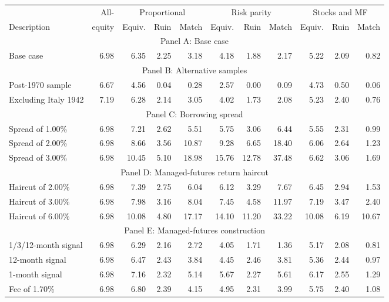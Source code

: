 \begin{table}[p]
{\small\setlength{\tabcolsep}{3pt}\begin{tabular}{lrrrrrrrrrr}\toprule
 & All- & \multicolumn{3}{c}{Proportional} & \multicolumn{3}{c}{Risk parity} & \multicolumn{3}{c}{Stocks and MF} \\ \cmidrule(lr){3-5}\cmidrule(lr){6-8}\cmidrule(lr){9-11}
Description & equity & Equiv. & Ruin & Match & Equiv. & Ruin & Match & Equiv. & Ruin & Match \\ \midrule
\multicolumn{11}{c}{Panel A: Base case} \\
Base case & 6.98 & 6.35 & 2.25 & 3.18 & 4.18 & 1.88 & 2.17 & 5.22 & 2.09 & 0.82 \\
\multicolumn{11}{c}{Panel B: Alternative samples} \\
Post-1970 sample & 6.67 & 4.56 & 0.04 & 0.28 & 2.57 & 0.00 & 0.09 & 4.73 & 0.50 & 0.06 \\
Excluding Italy 1942 & 7.19 & 6.28 & 2.14 & 3.05 & 4.02 & 1.73 & 2.08 & 5.23 & 2.40 & 0.76 \\
\multicolumn{11}{c}{Panel C: Borrowing spread} \\
Spread of 1.00\% & 6.98 & 7.21 & 2.62 & 5.51 & 5.75 & 3.06 & 6.44 & 5.55 & 2.31 & 0.99 \\
Spread of 2.00\% & 6.98 & 8.66 & 3.56 & 10.87 & 9.28 & 6.65 & 18.40 & 6.06 & 2.64 & 1.23 \\
Spread of 3.00\% & 6.98 & 10.45 & 5.10 & 18.98 & 15.76 & 12.78 & 37.48 & 6.62 & 3.06 & 1.69 \\
\multicolumn{11}{c}{Panel D: Managed-futures return haircut} \\
Haircut of 2.00\% & 6.98 & 7.39 & 2.75 & 6.04 & 6.12 & 3.29 & 7.67 & 6.45 & 2.94 & 1.53 \\
Haircut of 3.00\% & 6.98 & 7.98 & 3.16 & 8.04 & 7.45 & 4.58 & 11.97 & 7.19 & 3.47 & 2.40 \\
Haircut of 6.00\% & 6.98 & 10.08 & 4.80 & 17.17 & 14.10 & 11.20 & 33.22 & 10.08 & 6.19 & 10.67 \\
\multicolumn{11}{c}{Panel E: Managed-futures construction} \\
1/3/12-month signal & 6.98 & 6.29 & 2.16 & 2.72 & 4.05 & 1.71 & 1.36 & 5.17 & 2.08 & 0.81 \\
12-month signal & 6.98 & 6.47 & 2.43 & 3.84 & 4.45 & 2.46 & 3.81 & 5.36 & 2.44 & 0.97 \\
1-month signal & 6.98 & 7.16 & 2.32 & 5.14 & 5.67 & 2.27 & 5.61 & 6.17 & 2.55 & 1.29 \\
Fee of 1.70\% & 6.98 & 6.80 & 2.39 & 4.15 & 4.95 & 2.31 & 3.99 & 5.75 & 2.40 & 1.08 \\
\bottomrule\end{tabular}}
\end{table}
